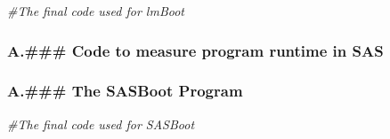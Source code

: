 \documentclass[]{article}
\newenvironment{Shaded}{\begin{snugshade}}{\end{snugshade}}
\newcommand{\KeywordTok}[1]{\textcolor[rgb]{0.13,0.29,0.53}{\textbf{#1}}}
\newcommand{\FloatTok}[1]{\textcolor[rgb]{0.00,0.00,0.81}{#1}}
\newcommand{\StringTok}[1]{\textcolor[rgb]{0.31,0.60,0.02}{#1}}
\newcommand{\CommentTok}[1]{\textcolor[rgb]{0.56,0.35,0.01}{\textit{#1}}}
\newcommand{\OperatorTok}[1]{\textcolor[rgb]{0.81,0.36,0.00}{\textbf{#1}}}
\newcommand{\ErrorTok}[1]{\textcolor[rgb]{0.64,0.00,0.00}{\textbf{#1}}}
\newcommand{\NormalTok}[1]{#1}
\begin{document}
\begin{Shaded}
\begin{Highlighting}[]
\CommentTok{#The final code used for lmBoot}
\end{Highlighting}
\end{Shaded}

\subsubsection{A.\#\#\# Code to measure program runtime in
SAS}\label{a.-code-to-measure-program-runtime-in-sas}

\begin{Shaded}
\end{Shaded}

\subsubsection{A.\#\#\# The SASBoot
Program}\label{a.-the-sasboot-program}

\begin{Shaded}
\begin{Highlighting}[]
\CommentTok{#The final code used for SASBoot}
\end{Highlighting}
\end{Shaded}
\end{document}
